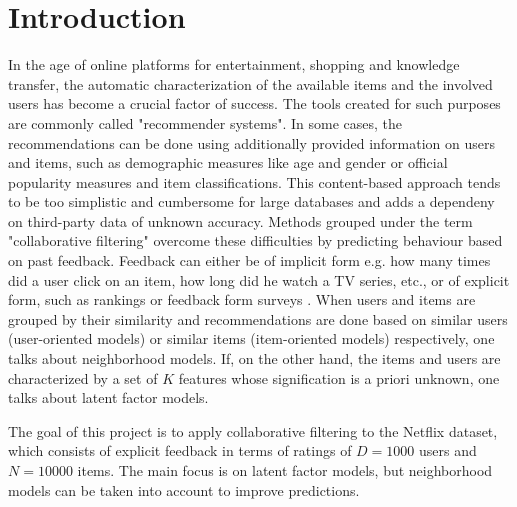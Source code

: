 \section{Introduction}

In the age of online platforms for entertainment, shopping and 
knowledge transfer, the automatic characterization of the available items and
the involved users has become a
crucial factor of success. 
The tools created for such purposes are commonly called "recommender
systems".
In some cases, the recommendations can be done using additionally provided
information on users and items, such as demographic measures like age and gender or official
popularity measures and item classifications. This content-based approach tends
to be too simplistic and cumbersome for large databases and adds a dependeny
on third-party data of unknown accuracy.  
Methods grouped under the term "collaborative filtering" overcome these
difficulties by predicting behaviour based on past feedback. Feedback can either be
of implicit form e.g. how many times did a user click on an item, how long did he
watch a TV series, etc., or of explicit form, such as rankings or feedback form
surveys \cite{Hu2008}.
When users and items are grouped by their similarity and recommendations are
done based on similar users (user-oriented models) or similar items
(item-oriented models) respectively, one talks about neighborhood models. 
If, on the other hand, the items and users are characterized by a set of $K$ features
whose signification is a priori unknown, one talks about latent factor models.


The goal of this project is to apply collaborative filtering to the Netflix
dataset, which consists of explicit feedback in terms of ratings of $D=1000$ users
and $N=10000$ items. The main focus is on latent factor models, but neighborhood
models can be taken into account to improve predictions.
